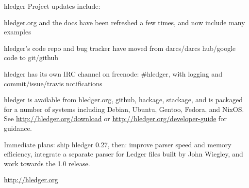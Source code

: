 \documentclass[DIV16,twocolumn,10pt]{scrreprt}
\begin{document}
\begin{hcarentry}{hledger}
Project updates include:
\begin{compactitem}
\item hledger.org and the docs have been refreshed a few times, and now include many examples
\item hledger's code repo and bug tracker have moved from darcs/darcs hub/google code to git/github
\item hledger has its own IRC channel on freenode: #hledger, with logging and commit/issue/travis notifications
\end{compactitem}


hledger is available from hledger.org, github, hackage, stackage, and
is packaged for a number of systems including Debian, Ubuntu, Gentoo,
Fedora, and NixOS.  See \url{http://hledger.org/download} or
\url{http://hledger.org/developer-guide} for guidance.


Immediate plans: ship hledger 0.27, then: 
improve parser speed and memory efficiency, 
integrate a separate parser for Ledger files built by John Wiegley,
and work towards the 1.0 release.

\FurtherReading
  \url{http://hledger.org}
\end{hcarentry}
\end{document}
